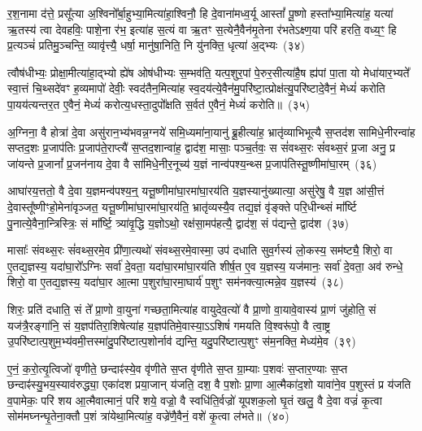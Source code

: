 र॒श॒नामा द॑त्ते॒ प्रसू᳚त्या अ॒श्विनो᳚र्बा॒हुभ्या॒मित्या॑हा॒श्विनौ॒ हि दे॒वाना॑मध्व॒र्यू आस्तां᳚ पू॒ष्णो हस्ता᳚भ्या॒मित्या॑ह॒ यत्या॑ ऋ॒तस्य॑ त्वा देवहविः॒ पाशे॒ना र॑भ॒ इत्या॑ह स॒त्यं वा ऋ॒तꣳ स॒त्येनै॒वैन॑मृ॒तेना र॑भते\-ऽक्ष्ण॒या परि॑ हरति॒ वध्य॒ꣳ॒ हि प्र॒त्यञ्चं॑ प्रतिमु॒ञ्चन्ति॒ व्यावृ॑त्त्यै॒ धर्\mbox{}षा॒ मानु॑षा॒निति॒ नि यु॑नक्ति॒ धृत्या॑ अ॒द्भ्यः~(३४)\ip

त्वौष॑धीभ्यः॒ प्रोक्षा॒मीत्या॑हा॒द्भ्यो ह्ये॑ष ओष॑धीभ्यः स॒म्भव॑ति॒ यत्प॒शुर॒पां पे॒रुर॒सीत्या॑है॒ष ह्य॑पां पा॒ता यो मेधा॑यार॒भ्यते᳚ स्वा॒त्तं चि॒थ्सदे॑वꣳ ह॒व्यमापो॑ देवीः॒ स्वद॑तैन॒मित्या॑ह स्व॒दय॑त्ये॒वैन॑मु॒परि॑ष्टा॒त्प्रोक्ष॑त्यु॒परि॑ष्टादे॒वैनं॒ मेध्यं॑ करोति पा॒यय॑त्यन्तर॒त ए॒वैनं॒ मेध्यं॑ करोत्य॒धस्ता॒दुपो᳚क्षति स॒र्वत॑ ए॒वैनं॒ मेध्यं॑ करोति॥~(३५)\ip

{\anuvakamend[{वसू॒निति॑ प्रस॒व इत्य॒द्भ्यो᳚\-ऽन्तर॒त ए॒वैन॒न्दश॑ च}]}

अ॒ग्निना॒ वै होत्रा॑ दे॒वा असु॑रान॒भ्य॑भवन्न॒ग्नये॑ समि॒ध्यमा॑ना॒यानु॑ ब्रू॒हीत्या॑ह॒ भ्रातृ॑व्याभिभूत्यै स॒प्तद॑श सामिधे॒नीरन्वा॑ह सप्तद॒शः प्र॒जा\-प॑तिः प्र॒जा\-प॑ते॒राप्त्यै॑ स॒प्तद॒शान्वा॑ह॒ द्वाद॑श॒ मासाः॒ पञ्च॒र्तवः॒ स सं॑वथ्स॒रः सं॑वथ्स॒रं प्र॒जा अनु॒ प्र जा॑यन्ते प्र॒जानां᳚ प्र॒जन॑नाय दे॒वा वै सा॑मिधे॒नीर॒नूच्य॑ य॒ज्ञं नान्व॑पश्य॒न्थ्स प्र॒जा\-प॑तिस्तू॒ष्णीमा॑घा॒रम्~(३६)\ip

आघा॑रय॒त्ततो॒ वै दे॒वा य॒ज्ञमन्व॑पश्य॒न्॒ यत्तू॒ष्णीमा॑घा॒रमा॑घा॒रय॑ति य॒ज्ञस्यानु॑ख्यात्या॒ असु॑रेषु॒ वै य॒ज्ञ आ॑सी॒त्तं दे॒वास्तू᳚ष्णीꣳहो॒मेना॑वृञ्जत॒ यत्तू॒ष्णीमा॑घा॒रमा॑घा॒रय॑ति॒ भ्रातृ॑व्यस्यै॒व तद्य॒ज्ञं वृ॑ङ्क्ते परि॒धीन्थ्सं मा᳚र्ष्टि पु॒नात्ये॒वैना॒न्त्रिस्त्रिः॒ सं मा᳚र्ष्टि॒ त्र्या॑वृ॒द्धि य॒ज्ञो\-ऽथो॒ रक्ष॑सा॒मप॑हत्यै॒ द्वाद॑श॒ सं प॑द्यन्ते॒ द्वाद॑श~(३७)\ip

मासाः᳚ संवथ्स॒रः सं॑वथ्स॒रमे॒व प्री॑णा॒त्यथो॑ संवथ्स॒रमे॒वास्मा॒ उप॑ दधाति सुव॒र्गस्य॑ लो॒कस्य॒ सम॑ष्ट्यै॒ शिरो॒ वा ए॒तद्य॒ज्ञस्य॒ यदा॑घा॒रो᳚\-ऽग्निः सर्वा॑ दे॒वता॒ यदा॑घा॒रमा॑घा॒रय॑ति शीर्\mbox{}ष॒त ए॒व य॒ज्ञस्य॒ यज॑मानः॒ सर्वा॑ दे॒वता॒ अव॑ रुन्धे॒ शिरो॒ वा ए॒तद्य॒ज्ञस्य॒ यदा॑घा॒र आ॒त्मा प॒शुरा॑घा॒रमा॒घार्य॑ प॒शुꣳ सम॑नक्त्या॒त्मन्ने॒व य॒ज्ञस्य॑~(३८)\ip

शिरः॒ प्रति॑ दधाति॒ सं ते᳚ प्रा॒णो वा॒युना॑ गच्छता॒मित्या॑ह वायुदेव॒त्यो॑ वै प्रा॒णो वा॒यावे॒वास्य॑ प्रा॒णं जु॑होति॒ सं यज॑त्रै॒रङ्गा॑नि॒ सं य॒ज्ञप॑तिरा॒शिषेत्या॑ह य॒ज्ञप॑तिमे॒वास्या॒\-ऽऽ\-शिषं॑ गमयति वि॒श्वरू॑पो॒ वै त्वा॒ष्ट्र उ॒परि॑ष्टात्प॒शुम॒भ्य॑वमी॒त्तस्मा॑दु॒परि॑ष्टात्प॒शोर्नाव॑ द्यन्ति॒ यदु॒परि॑ष्टात्प॒शुꣳ स॑म॒नक्ति॒ मेध्य॑मे॒व~(३९)\ip

ए॒नं॒ क॒रो॒त्यृ॒त्विजो॑ वृणीते॒ छन्दाꣴ॑स्ये॒व वृ॑णीते स॒प्त वृ॑णीते स॒प्त ग्रा॒म्याः प॒शवः॑ स॒प्तार॒ण्याः स॒प्त छन्दाꣴ॑स्यु॒भय॒स्याव॑रुद्ध्या॒ एका॑\-दश प्रया॒जान् य॑जति॒ दश॒ वै प॒शोः प्रा॒णा आ॒त्मैका॑द॒शो यावा॑ने॒व प॒शुस्तं प्र य॑जति व॒पामेकः॒ परि॑ शय आ॒त्मैवात्मानं॒ परि॑ शये॒ वज्रो॒ वै स्वधि॑ति॒र्वज्रो॑ यूपशक॒लो घृ॒तं खलु॒ वै दे॒वा वज्रं॑ कृ॒त्वा सोम॑मघ्नन्घृ॒तेना॒क्तौ प॒शं त्रा॑येथा॒मित्या॑ह॒ वज्रे॑णै॒वैनं॒ वशे॑ कृ॒त्वा ल॑भते॥~(४०)\ip

